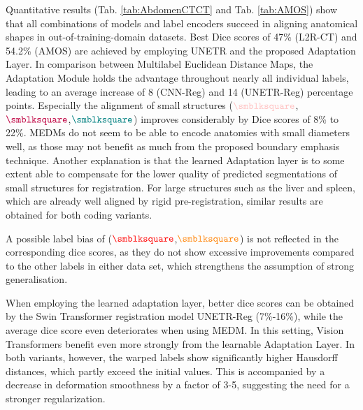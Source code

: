 Quantitative results (Tab. \ref{tab:AbdomenCTCT} and Tab. \ref{tab:AMOS}) show that all combinations of models and label encoders succeed in aligning anatomical shapes in out-of-training-domain datasets. Best Dice scores of 47\% (L2R-CT) and 54.2\% (AMOS) are achieved by employing UNETR and the proposed Adaptation Layer.
In comparison between Multilabel Euclidean Distance Maps, the Adaptation Module holds the advantage throughout nearly all individual labels, leading to an average increase of 8 (CNN-Reg) and 14 (UNETR-Reg) percentage points. Especially the alignment of small structures ($\color{pink}{\smblksquare}$,$\color{purple}{\smblksquare}$,$\color{teal}{\smblksquare}$) improves considerably by Dice scores of 8\% to 22\%. MEDMs do not seem to be able to encode anatomies with small diameters well, as those may not benefit as much from the proposed boundary emphasis technique. Another explanation is that the learned Adaptation layer is to some extent able to compensate for the lower quality of predicted segmentations of small structures for registration. For large structures such as the liver and spleen, which are already well aligned by rigid pre-registration, similar results are obtained for both coding variants.


A possible label bias of ($\color{red}{\smblksquare}$,$\color{orange}{\smblksquare}$) is not reflected in the corresponding dice scores, as they do not show excessive improvements compared to the other labels in either data set, which strengthens the assumption of strong generalisation.

When employing the learned adaptation layer, better dice scores can be obtained by the Swin Transformer registration model UNETR-Reg (7\%-16\%), while the average dice score even deteriorates when using MEDM. In this setting, Vision Transformers benefit even more strongly from the learnable Adaptation Layer. In both variants, however, the warped labels show significantly higher Hausdorff distances, which partly exceed the initial values. This is accompanied by a decrease in deformation smoothness by a factor of 3-5, suggesting the need for a stronger regularization.

